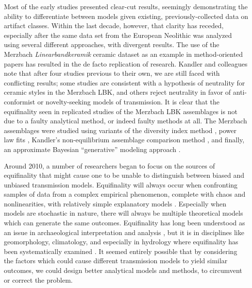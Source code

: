 Most of the early studies presented clear-cut results, seemingly demonstrating the ability to differentiate between models given existing, previously-collected data on artifact classes.  Within the last decade, however, that clarity has receded, especially after the same data set from the European Neolithic was analyzed using several different approaches, with divergent results. The use of the Merzbach \emph{Linearbandkeramik} ceramic dataset as an example in method-oriented papers has resulted in the de facto replication of research.  Kandler and colleagues \citeyearpar{Kandler20150905} note that after four studies previous to their own, we are still faced with conflicting results; some studies are consistent with a hypothesis of neutrality for ceramic styles in the Merzbach LBK, and others reject neutrality in favor of anti-conformist or novelty-seeking models of transmission.  It is clear that the equifinality seen in replicated studies of the Merzbach LBK assemblages is not due to a faulty analytical method, or indeed faulty methods at all.  The Merzbach assemblages were studied using variants of the diversity index method \citep{Shennan2001,shennan2008style}, power law fits \citep{Bentley2003,shennan2008style}, Kandler's non-equilibrium assemblage comparison method \citep{Kandler2013}, and finally, an approximate Bayesian ``generative'' modeling approach \citep{Kandler20150905}. 

Around 2010, a number of researchers began to focus on the sources of equifinality that might cause one to be unable to distinguish between biased and unbiased transmission models.  Equifinality will always occur when confronting samples of data from a complex empirical phenomenon, complete with chaos and nonlinearities, with relatively simple explanatory models \citep{bertalanffy1969general}.  Especially when models are stochastic in nature, there will always be multiple theoretical models which can generate the same outcomes.  Equifinality has long been understood as an issue in archaeological interpretation and analysis , but it is in disciplines like geomorphology, climatology, and especially in hydrology where equifinality has been systematically examined .  It seemed entirely possible that by considering the factors which could cause different transmission models to yield similar outcomes, we could design better analytical models and methods, to circumvent or correct the problem.

